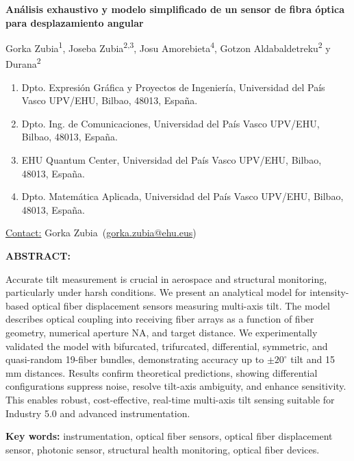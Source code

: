 \documentclass[11pt,a4paper]{article}
\newcommand{\customauthor}[1]{%
    \begin{center}
    \fontsize{11pt}{13pt}\selectfont #1
    \end{center}%
}
\newenvironment{customabstract}{%
    \begin{center}%
        \customabstractframe%
        \bfseries\fontsize{12pt}{14pt}\selectfont
        ABSTRACT:\par\medskip
        \normalfont\fontsize{11pt}{13pt}\selectfont
        }{%
        \endcustomabstractframe%
    \end{center}%
}
\begin{document}
    \begin{center}
        \fontsize{16}{19}\selectfont\bfseries
        Análisis exhaustivo y modelo simplificado de un sensor de fibra óptica para desplazamiento angular
\end{center}

    \vspace{1ex}
    \customauthor{%
        Gorka Zubia\textsuperscript{1},\;
        Joseba Zubia\textsuperscript{2,3},\;
        Josu Amorebieta\textsuperscript{4},\;
        Gotzon Aldabaldetreku\textsuperscript{2} y Durana\textsuperscript{2}%
    }
    \begin{enumerate}[leftmargin=1cm, rightmargin=1cm, label=\arabic*., itemsep=0pt, parsep=4pt]
        \item Dpto. Expresión Gráfica y Proyectos de Ingeniería, Universidad del País Vasco UPV/EHU, Bilbao, 48013, España.
        \item Dpto. Ing. de Comunicaciones, Universidad del País Vasco UPV/EHU, Bilbao, 48013, España.
        \item EHU Quantum Center, Universidad del País Vasco UPV/EHU, Bilbao, 48013, España.
        \item Dpto. Matemática Aplicada, Universidad del País Vasco UPV/EHU, Bilbao, 48013, España.
    \end{enumerate}
    \begin{center}
        \vspace{-1ex}
        \underline{Contact:}\quad
        Gorka Zubia~(\href{mailto:gorka.zubia@ehu.eus}{gorka.zubia@ehu.eus})
    \end{center}
    \begin{customabstract}
        Accurate tilt measurement is crucial in aerospace and structural monitoring, particularly under harsh conditions. We present an analytical model for intensity-based optical fiber displacement sensors measuring multi-axis tilt. The model describes optical coupling into receiving fiber arrays as a function of fiber geometry, numerical aperture NA, and target distance. We experimentally validated the model with bifurcated, trifurcated, differential, symmetric, and quasi-random 19-fiber bundles, demonstrating accuracy up to \(\pm20^\circ\) tilt and 15 mm distances. Results confirm theoretical predictions, showing differential configurations suppress noise, resolve tilt-axis ambiguity, and enhance sensitivity. This enables robust, cost-effective, real-time multi-axis tilt sensing suitable for Industry 5.0 and advanced instrumentation.

        \medskip
        \textbf{Key words:} instrumentation, optical fiber sensors, optical fiber displacement sensor, photonic sensor, structural health monitoring, optical fiber devices.
    \end{customabstract}
\end{document}
